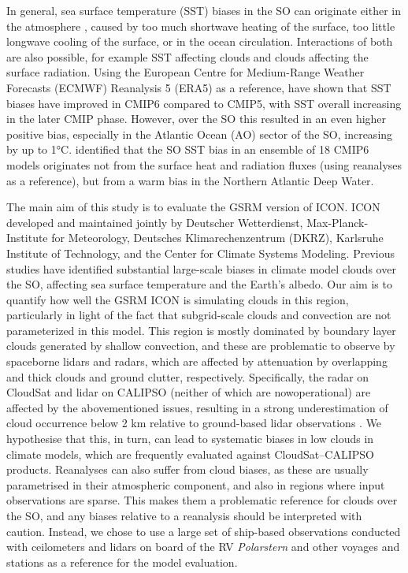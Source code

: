\documentclass[12pt,a4paper]{article}
\begin{document}
In general, sea surface temperature (SST) biases in the SO can originate either
in the atmosphere \citep{hyder2018}, caused by too much shortwave heating of
the surface, too little longwave cooling of the surface, or in the ocean
circulation.  Interactions of both are also possible, for example SST affecting
clouds and clouds affecting the surface radiation. Using the European Centre
for Medium-Range Weather Forecasts (ECMWF) Reanalysis 5 (ERA5) as a reference,
\cite{zhang2023} have shown that SST biases have improved in CMIP6 compared to
CMIP5, with SST overall increasing in the later CMIP phase. However, over the
SO this resulted in an even higher positive bias, especially in the Atlantic
Ocean (AO) sector of the SO, increasing by up to 1°C.  \cite{luo2023}
identified that the SO SST bias in an ensemble of 18 CMIP6 models originates
not from the surface heat and radiation fluxes (using reanalyses as a
reference), but from a warm bias in the Northern Atlantic Deep Water.

The main aim of this study is to evaluate the GSRM version of ICON. ICON
developed and maintained jointly by Deutscher Wetterdienst,
Max-Planck-Institute for Meteorology, Deutsches Klimarechenzentrum (DKRZ),
Karlsruhe Institute of Technology, and the Center for Climate Systems Modeling.
Previous studies have identified substantial large-scale biases in climate
model clouds over the SO, affecting sea surface temperature and the Earth’s
albedo. Our aim is to quantify how well the GSRM ICON is simulating clouds in
this region, particularly in light of the fact that subgrid-scale clouds and
convection are not parameterized in this model. This region is mostly dominated
by boundary layer clouds generated by shallow convection, and these are
problematic to observe by spaceborne lidars and radars, which are affected by
attenuation by overlapping and thick clouds and ground clutter, respectively.
Specifically, the radar on CloudSat and lidar on CALIPSO (neither of which are
nowoperational) are affected by the abovementioned issues, resulting in a
strong underestimation of cloud occurrence below 2 km relative to ground-based
lidar observations \citep{mcerlich2021}.  We hypothesise that this, in turn,
can lead to systematic biases in low clouds in climate models, which are
frequently evaluated against CloudSat--CALIPSO products. Reanalyses can also
suffer from cloud biases, as these are usually parametrised in their
atmospheric component, and also in regions where input observations are sparse.
This makes them a problematic reference for clouds over the SO, and any biases
relative to a reanalysis should be interpreted with caution. Instead, we chose
to use a large set of ship-based observations conducted with ceilometers and
lidars on board of the RV \emph{Polarstern} and other voyages and stations as a
reference for the model evaluation.
\end{document}
